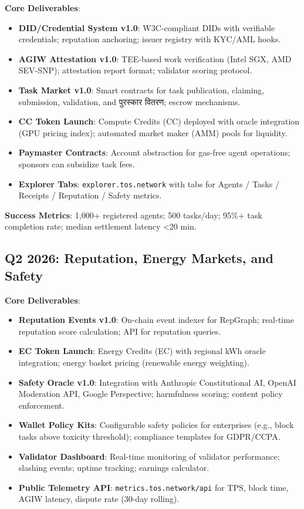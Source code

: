 \documentclass[11pt]{article}
\begin{document}
\begin{itemize}[noitemsep]
\begin{itemize}[noitemsep]
\begin{itemize}[noitemsep]
\begin{itemize}[noitemsep]
\begin{itemize}[noitemsep]
\begin{itemize}[noitemsep]
\textbf{Core Deliverables}:
\begin{itemize}[noitemsep]
  \item \textbf{DID/Credential System v1.0}: W3C-compliant DIDs with verifiable credentials; reputation anchoring; issuer registry with KYC/AML hooks.
  \item \textbf{AGIW Attestation v1.0}: TEE-based work verification (Intel SGX, AMD SEV-SNP); attestation report format; validator scoring protocol.
  \item \textbf{Task Market v1.0}: Smart contracts for task publication, claiming, submission, validation, and पुरस्कार वितरण; escrow mechanisms.
  \item \textbf{CC Token Launch}: Compute Credits (CC) deployed with oracle integration (GPU pricing index); automated market maker (AMM) pools for liquidity.
  \item \textbf{Paymaster Contracts}: Account abstraction for gas-free agent operations; sponsors can subsidize task fees.
  \item \textbf{Explorer Tabs}: \texttt{explorer.tos.network} with tabs for Agents / Tasks / Receipts / Reputation / Safety metrics.
\end{itemize}

\textbf{Success Metrics}: 1,000+ registered agents; 500 tasks/day; 95\%+ task completion rate; median settlement latency <20 min.

\subsection{Q2 2026: Reputation, Energy Markets, and Safety}

\textbf{Core Deliverables}:
\begin{itemize}[noitemsep]
  \item \textbf{Reputation Events v1.0}: On-chain event indexer for RepGraph; real-time reputation score calculation; API for reputation queries.
  \item \textbf{EC Token Launch}: Energy Credits (EC) with regional kWh oracle integration; energy basket pricing (renewable energy weighting).
  \item \textbf{Safety Oracle v1.0}: Integration with Anthropic Constitutional AI, OpenAI Moderation API, Google Perspective; harmfulness scoring; content policy enforcement.
  \item \textbf{Wallet Policy Kits}: Configurable safety policies for enterprises (e.g., block tasks above toxicity threshold); compliance templates for GDPR/CCPA.
  \item \textbf{Validator Dashboard}: Real-time monitoring of validator performance; slashing events; uptime tracking; earnings calculator.
  \item \textbf{Public Telemetry API}: \texttt{metrics.tos.network/api} for TPS, block time, AGIW latency, dispute rate (30-day rolling).
\end{itemize}


\end{itemize}
\end{itemize}
\end{itemize}
\end{itemize}
\end{itemize}
\end{itemize}
\end{document}
